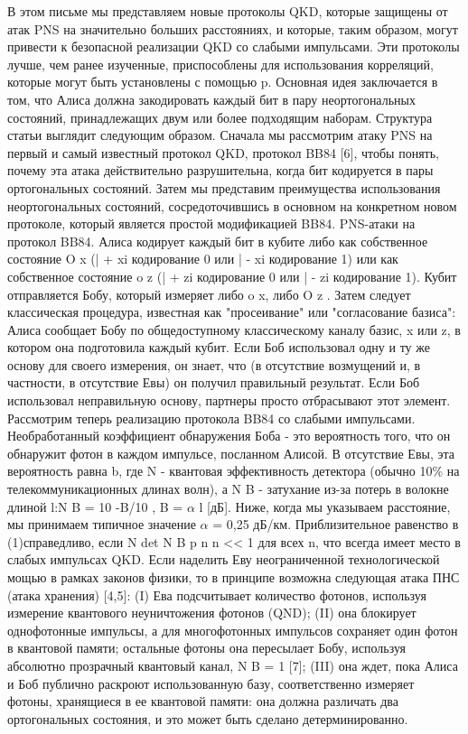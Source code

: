 В этом письме мы представляем новые протоколы QKD, которые защищены от атак PNS на значительно больших расстояниях, и которые, таким образом, могут привести к безопасной реализации QKD со слабыми импульсами. Эти протоколы лучше, чем ранее изученные, приспособлены для использования корреляций, которые могут быть установлены с помощью p. Основная идея заключается в том, что Алиса должна закодировать каждый бит в пару неортогональных состояний, принадлежащих двум или более подходящим наборам.
Структура статьи выглядит следующим образом. Сначала мы рассмотрим атаку PNS на первый и самый известный протокол QKD, протокол BB84 [6], чтобы понять, почему эта атака действительно разрушительна, когда бит кодируется в пары ортогональных состояний. Затем мы представим преимущества использования неортогональных состояний, сосредоточившись в основном на конкретном новом протоколе, который является простой модификацией BB84.
PNS-атаки на протокол BB84. Алиса кодирует каждый бит в кубите либо как собственное состояние O x (| + xi кодирование
0 или | - xi кодирование 1) или как собственное состояние o z (| + zi кодирование 0 или | - zi кодирование 1). Кубит отправляется Бобу, который измеряет либо o x, либо O z . Затем следует классическая процедура, известная как "просеивание" или "согласование базиса": Алиса сообщает Бобу по общедоступному классическому каналу базис, x или z, в котором она подготовила каждый кубит.
Если Боб использовал одну и ту же основу для своего измерения, он знает, что (в отсутствие возмущений и, в частности, в отсутствие Евы) он получил правильный результат. Если Боб использовал неправильную основу, партнеры просто отбрасывают этот элемент.
Рассмотрим теперь реализацию протокола BB84 со слабыми импульсами. Необработанный коэффициент обнаружения Боба - это вероятность того, что он обнаружит фотон в каждом импульсе, посланном Алисой. В отсутствие Евы, эта вероятность равна b, где N - квантовая эффективность детектора (обычно 10\% на телекоммуникационных длинах волн), а N B - затухание из-за потерь в волокне длиной l:N B = 10 -B/10 , B = $\alpha$ l [дБ]. Ниже, когда мы указываем расстояние, мы принимаем типичное значение $\alpha$ = 0,25 дБ/км. Приблизительное равенство в (1)справедливо, если N det N B p n n << 1 для всех n, что всегда имеет место в слабых импульсах QKD.
Если наделить Еву неограниченной технологической мощью в рамках законов физики, то в принципе возможна следующая атака ПНС (атака хранения) [4,5]: (I) Ева подсчитывает количество фотонов, используя измерение квантового неуничтожения фотонов (QND); (II) она блокирует однофотонные импульсы, а для многофотонных импульсов сохраняет один фотон в квантовой памяти; остальные фотоны она пересылает Бобу, используя абсолютно прозрачный квантовый канал, N B = 1 [7]; (III) она ждет, пока Алиса и Боб публично раскроют использованную базу, соответственно измеряет фотоны, хранящиеся в ее квантовой памяти: она должна различать два ортогональных состояния, и это может быть сделано детерминированно.
